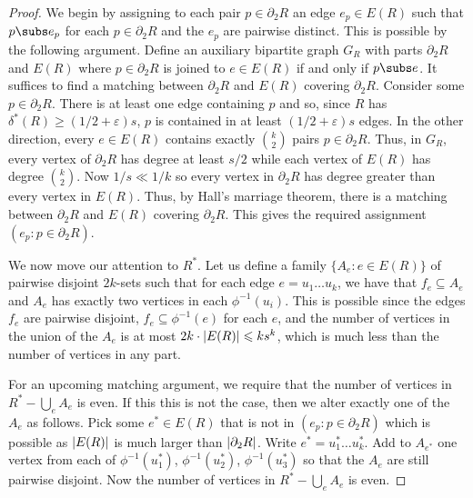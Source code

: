 \documentclass[12pt,reqno]{amsart}
\theoremstyle{plain}
\theoremstyle{definition}
\numberwithin{equation}{section}
\DeclarePairedDelimiter{\abs}{\lvert}{\rvert}
\renewcommand{\ge}{\geqslant}
\renewcommand{\leq}{\leqslant}
\renewcommand{\subset}{\subseteq}
\newcommand{\eps}{\varepsilon}
\newcommand{\comin}{\delta^{\ast}}
\begin{document}
	\begin{proof}
		We begin by assigning to each pair $p \in \partial_2 R$ an edge $e_p \in E(R)$ such that $p \subs e_p$ for each $p \in \partial_2 R$ and the $e_p$ are pairwise distinct.
		This is possible by the following argument.
		Define an auxiliary bipartite graph $G_R$ with parts $\partial_2 R$ and $E(R)$ where $p \in \partial_2 R$ is joined to $e \in E(R)$ if and only if $p \subs e$. It suffices to find a matching between $\partial_2 R$ and $E(R)$ covering $\partial_2 R$. Consider some $p \in \partial_2 R$. There is at least one edge containing $p$ and so, since $R$ has $\comin(R) \ge (1/2+\eps)s$, $p$ is contained in at least $(1/2 + \eps)s$ edges. In the other direction, every $e \in E(R)$ contains exactly $\binom{k}{2}$ pairs $p \in \partial_2 R$. Thus, in $G_R$, every vertex of $\partial_2 R$ has degree at least $s/2$ while each vertex of $E(R)$ has degree $\binom{k}{2}$. Now $1/s \ll 1/k$ so every vertex in $\partial_2 R$ has degree greater than every vertex in $E(R)$. Thus, by Hall's marriage theorem, there is a matching between $\partial_2 R$ and $E(R)$ covering $\partial_2 R$.
		This gives the required assignment $(e_p \colon p \in \partial_2 R)$.
		
		We now move our attention to $R^\ast$.
		Let us define a family $\{A_e \colon e \in E(R)\}$ of pairwise disjoint $2k$-sets such that for each edge $e= u_1 \dotsc u_k$, we have that $f_e \subseteq A_e$ and $A_e$ has exactly two vertices in each $\phi^{-1}(u_i)$.
		This is possible since the edges $f_e$ are pairwise disjoint, $f_e \subset \phi^{-1}(e)$ for each $e$, and the number of vertices in the union of the $A_e$ is at most $2k \cdot \abs{E(R)} \leq k s^k$, which is much less than the number of vertices in any part.
		
		For an upcoming matching argument, we require that the number of vertices in $R^\ast - \bigcup_e A_e$ is even.
		If this this is not the case, then we alter exactly one of the $A_e$ as follows. Pick some $e^\ast \in E(R)$ that is not in $(e_p \colon p \in \partial_2 R)$ which is possible as $\abs{E(R)}$ is much larger than $\abs{\partial_2 R}$. Write $e^\ast = u^\ast_1 \dotsc u^\ast_k$. Add to $A_{e^\ast}$ one vertex from each of $\phi^{-1}(u_1^\ast)$, $\phi^{-1}(u_2^\ast)$, $\phi^{-1}(u_3^\ast)$ so that the $A_e$ are still pairwise disjoint. Now the number of vertices in $R^\ast - \bigcup_e A_e$ is even.
		

\end{proof}
\end{document}
